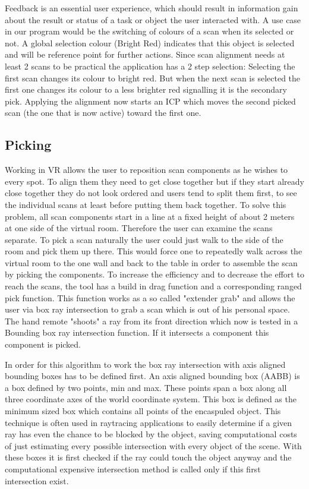 \documentclass[hyperref,english,bachelorofscience,bibnum]{cgvpub}
\begin{document}
Feedback is an essential user experience, which should result in information gain about the result or status of a task or object the user interacted with\cite{Jerald}.
A use case in our program would be the switching of colours of a scan when its selected or not. A global selection colour (Bright Red) indicates that this object is selected and will be reference point for further actions. Since scan alignment needs at least 2 scans to be practical the application has a 2 step selection:
Selecting the first scan changes its colour to bright red. But when the next scan is selected the first one changes its colour to a less brighter red signalling it is the secondary pick. Applying the alignment now starts an ICP which moves the second picked scan (the one that is now active) toward the first one.

\subsection{Picking}

Working in VR allows the user to reposition scan components as he wishes to every spot. To align them they need to get close together but if they start already close together they do not look ordered and users tend to split them first, to see the individual scans at least before putting them back together. To solve this problem, all scan components start in a line at a fixed height of about 2 meters at one side of the virtual room. Therefore the user can examine the scans separate.
To pick a scan naturally the user could just walk to the side of the room and pick them up there. This would force one to repeatedly walk across the virtual room to the one wall and back to the table in order to assemble the scan by picking the components. To increase the efficiency and to decrease the effort to reach the scans, the tool has a build in drag function and a corresponding ranged pick function. This function works as a so called "extender grab"\cite{Jerald2015} %
and allows the user via box ray intersection to grab a scan which is out of his personal space.
The hand remote "shoots" a ray from its front direction which now is tested in a Bounding box ray intersection function. If it intersects a component this component is picked.


In order for this algorithm to work the box ray intersection with axis aligned bounding boxes has to be defined first.
An axis aligned bounding box (AABB) is a box defined by two points, min and max. These points span a box along all three coordinate axes of the world coordinate system. This box is defined as the minimum sized box which contains all points of the encaspuled object. This technique is often used in raytracing applications to easily determine if a given ray has even the chance to be blocked by the object, saving computational costs of just estimating every possible intersection with every object of the scene. With these boxes it is first checked if the ray could touch the object anyway and the computational expensive intersection method is called only if this first intersection exist.
\end{document}
